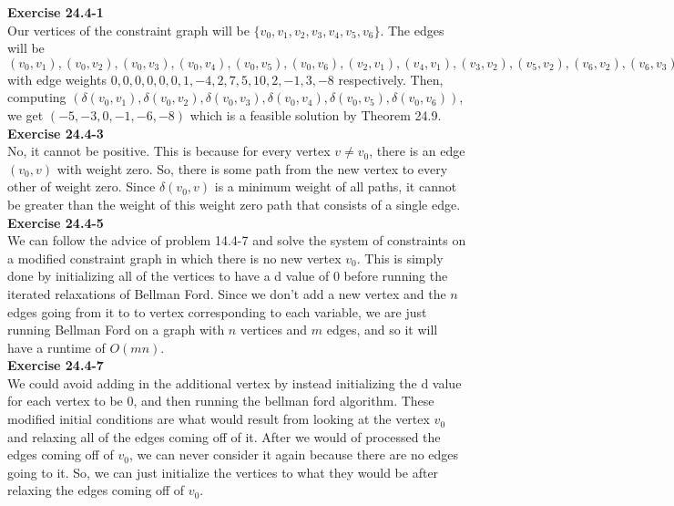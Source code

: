 \documentclass{article}
\begin{document}


\noindent\textbf{Exercise 24.4-1}\\

Our vertices of the constraint graph will be $\{v_0,v_1,v_2,v_3,v_4,v_5,v_6\}$. The edges will be $(v_0,v_1),(v_0,v_2),(v_0,v_3),(v_0,v_4),(v_0,v_5),(v_0,v_6),(v_2,v_1),(v_4,v_1),(v_3,v_2),(v_5,v_2),(v_6,v_2),(v_6,v_3),(v_2,v_4),(v_1,v_5),(v_4,v_5),(v_3,v_6)$ with edge weights $0,0,0,0,0,0,1,-4,2,7,5,10,2,-1,3,-8$ respectively. Then, computing $(\delta(v_0,v_1),\delta(v_0,v_2),\delta(v_0,v_3),\delta(v_0,v_4),\delta(v_0,v_5),\delta(v_0,v_6))$, we get $(-5,-3,0,-1,-6,-8)$ which is a feasible solution by Theorem 24.9.\\



\noindent\textbf{Exercise 24.4-3}\\

No, it cannot be positive. This is because for every vertex $v\neq v_0$, there is an edge $(v_0,v)$ with weight zero. So, there is some path from the new vertex to every other of weight zero. Since $\delta(v_0,v)$ is a minimum weight of all paths, it cannot be greater than the weight of this weight zero path that consists of a single edge.\\



\noindent\textbf{Exercise 24.4-5}\\

We can follow the advice of problem 14.4-7 and solve the system of constraints on a modified constraint graph in which there is no new vertex $v_0$. This is simply done by initializing all of the vertices to have a d value of 0 before running the iterated relaxations of Bellman Ford. Since we don't add a new vertex and the $n$ edges going from it to to vertex corresponding to each variable, we are just running Bellman Ford on a graph with $n$ vertices and $m$ edges, and so it will have a runtime of $O(mn)$.\\



\noindent\textbf{Exercise 24.4-7}\\

We could avoid adding in the additional vertex by instead initializing the d value for each vertex to be 0, and then running the bellman ford algorithm. These modified initial conditions are what would result from looking at the vertex $v_0$ and relaxing all of the edges coming off of it. After we would of processed the edges coming off of $v_0$, we can never consider it again because there are no edges going to it. So, we can just initialize the vertices to what they would be after relaxing the edges coming off of $v_0$.\\
\end{document}
